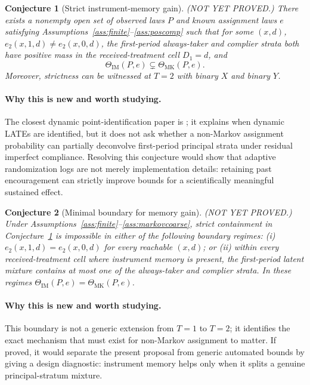 \documentclass[11pt]{article}
\theoremstyle{definition}
\theoremstyle{plain}
\newtheorem{conjecture}{Conjecture}
\theoremstyle{remark}
\begin{document}
\begin{conjecture}[Strict instrument-memory gain]\label{conj:strict-memory}
(NOT YET PROVED.)  There exists a nonempty open set of observed laws \(P\) and known assignment laws \(e\) satisfying Assumptions~\ref{ass:finite}--\ref{ass:poscomp} such that for some \((x,d)\), \(e_2(x,1,d)\ne e_2(x,0,d)\), the first-period always-taker and complier strata both have positive mass in the received-treatment cell \(D_1=d\), and
\[
\Theta_{\mathrm{IM}}(P,e)\subsetneq \Theta_{\mathrm{MK}}(P,e).
\]
Moreover, strictness can be witnessed at \(T=2\) with binary \(X\) and binary \(Y\).
\end{conjecture}
\paragraph{Why this is new and worth studying.}
The closest dynamic point-identification paper is \citet{SojitraSyrgkanis2024}; it explains when dynamic LATEs are identified, but it does not ask whether a non-Markov assignment probability can partially deconvolve first-period principal strata under residual imperfect compliance.  Resolving this conjecture would show that adaptive randomization logs are not merely implementation details: retaining past encouragement can strictly improve bounds for a scientifically meaningful sustained effect.

\begin{conjecture}[Minimal boundary for memory gain]\label{conj:minimal-boundary}
(NOT YET PROVED.)  Under Assumptions~\ref{ass:finite}--\ref{ass:markovcoarse}, strict containment in Conjecture~\ref{conj:strict-memory} is impossible in either of the following boundary regimes: (i) \(e_2(x,1,d)=e_2(x,0,d)\) for every reachable \((x,d)\); or (ii) within every received-treatment cell where instrument memory is present, the first-period latent mixture contains at most one of the always-taker and complier strata.  In these regimes \(\Theta_{\mathrm{IM}}(P,e)=\Theta_{\mathrm{MK}}(P,e)\).
\end{conjecture}
\paragraph{Why this is new and worth studying.}
This boundary is not a generic extension from \(T=1\) to \(T=2\); it identifies the exact mechanism that must exist for non-Markov assignment to matter.  If proved, it would separate the present proposal from generic automated bounds by giving a design diagnostic: instrument memory helps only when it splits a genuine principal-stratum mixture.
\end{document}
